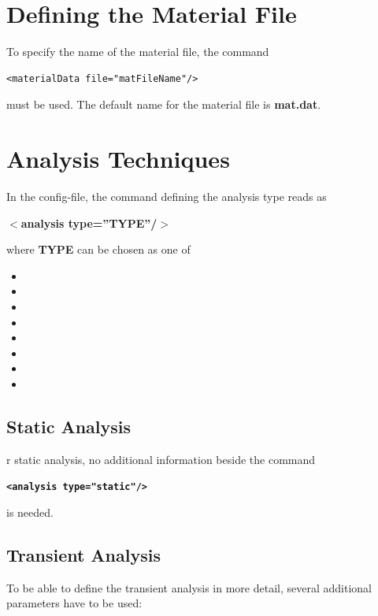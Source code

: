 \section{Defining the Material File}
To specify the name of the material file, the command 
\begin{verbatim}
<materialData file="matFileName"/>
\end{verbatim}
must be used. The default name for the material file is {\bf mat.dat}.

%
%
\section{Analysis Techniques}\label{subsec:Analysis}
In the config-file, the command defining the analysis type reads as

\textbf{$<$analysis type=''TYPE''/$>$}

\noindent
where {\bf TYPE} can be chosen as one of
\begin{itemize} 
\item {} 
\item {}
\item {}
\item {}
\item {}
\item {}
\item {}
\item {}
\end{itemize}


\subsection{Static Analysis}
%
%
r static analysis, no additional information beside the command

{\bf \verb!<analysis type="static"/>!}

\noindent
is needed.

\subsection{Transient Analysis}
%
To be able to define the transient analysis in more detail, several
additional parameters have to be used:

